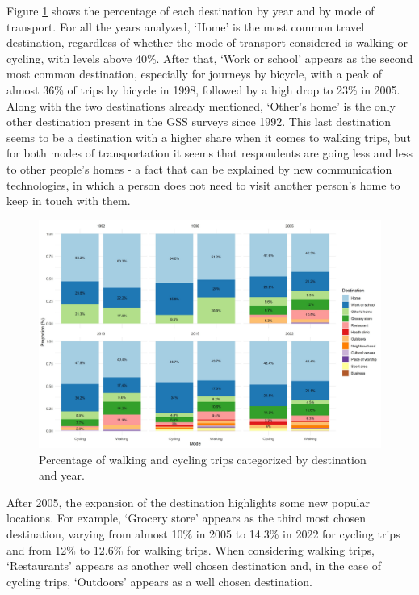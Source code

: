 \documentclass[preprint, 3p,
authoryear]{elsarticle} %
\begin{document}
Figure \ref{fig:figure-destmodeyearperc} shows the percentage of each
destination by year and by mode of transport. For all the years
analyzed, `Home' is the most common travel destination, regardless of
whether the mode of transport considered is walking or cycling, with
levels above 40\%. After that, `Work or school' appears as the second
most common destination, especially for journeys by bicycle, with a peak
of almost 36\% of trips by bicycle in 1998, followed by a high drop to
23\% in 2005. Along with the two destinations already mentioned,
`Other's home' is the only other destination present in the GSS surveys
since 1992. This last destination seems to be a destination with a
higher share when it comes to walking trips, but for both modes of
transportation it seems that respondents are going less and less to
other people's homes - a fact that can be explained by new communication
technologies, in which a person does not need to visit another person's
home to keep in touch with them.

\begin{figure}
\includegraphics[width=1\linewidth]{figures/destination_percentual} \caption{Percentage of walking and cycling trips categorized by destination and year.}\label{fig:figure-destmodeyearperc}
\end{figure}

After 2005, the expansion of the destination highlights some new popular
locations. For example, `Grocery store' appears as the third most chosen
destination, varying from almost 10\% in 2005 to 14.3\% in 2022 for
cycling trips and from 12\% to 12.6\% for walking trips. When
considering walking trips, `Restaurants' appears as another well chosen
destination and, in the case of cycling trips, `Outdoors' appears as a
well chosen destination.
\end{document}
